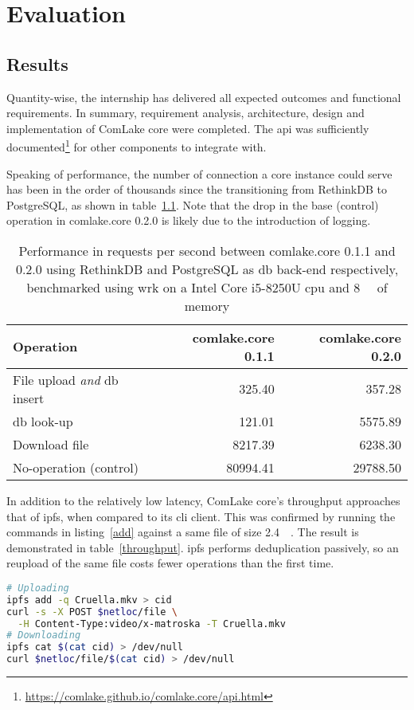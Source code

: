 \chapter{Evaluation}

\section{Results}
Quantity-wise, the internship has delivered
all expected outcomes and functional requirements.  In summary,
requirement analysis, architecture, design and implementation
of ComLake core were completed.  The \gls{api} was sufficiently
documented\footnote{\url{https://comlake.github.io/comlake.core/api.html}}
for other components to integrate with.

Speaking of performance, the number of connection a core instance could serve
has been in the order of thousands since the transitioning from RethinkDB
to PostgreSQL, as shown in table~\ref{rdbpsql}.  Note that the drop in
the base (control) operation in comlake.core 0.2.0 is likely due to
the introduction of logging.
\begin{table}\centering
  \caption{Performance in requests per second between comlake.core 0.1.1
  and 0.2.0 using RethinkDB and PostgreSQL as \gls{db} back-end respectively,
  benchmarked using wrk on a Intel\textsuperscript{\tiny\textregistered}
  Core\textsuperscript{\tiny\texttrademark} i5-8250U \acrshort{cpu} and
  \SI{8}{\giga\byte} of memory}
  \begin{tabular}{l r r}
    \toprule
    Operation & comlake.core 0.1.1 & comlake.core 0.2.0\\
    \midrule
    File upload \emph{and} \gls{db} insert & 325.40 & 357.28\\
    \gls{db} look-up & 121.01 & 5575.89\\
    Download file & 8217.39 & 6238.30\\
    No-operation (control) & 80994.41 & 29788.50\\
    \bottomrule
  \end{tabular}
  \label{rdbpsql}
\end{table}

In addition to the relatively low latency, ComLake core's throughput
approaches that of \gls{ipfs}, when compared to its \gls{cli} client.
This was confirmed by running the commands in listing~\ref{add} against
a same file of size \SI{2.4}{\giga\byte}.  The result is demonstrated
in table~\ref{throughput}.  \gls{ipfs} performs deduplication passively,
so an reupload of the same file costs fewer operations than the first time.
\begin{lstlisting}[label=add,caption=Adding Cruella.mkv
  through \gls{ipfs} \gls{cli} client and ComLake core,language=sh]
# Uploading
ipfs add -q Cruella.mkv > cid
curl -s -X POST $netloc/file \
  -H Content-Type:video/x-matroska -T Cruella.mkv
# Downloading
ipfs cat $(cat cid) > /dev/null
curl $netloc/file/$(cat cid) > /dev/null
\end{lstlisting}

